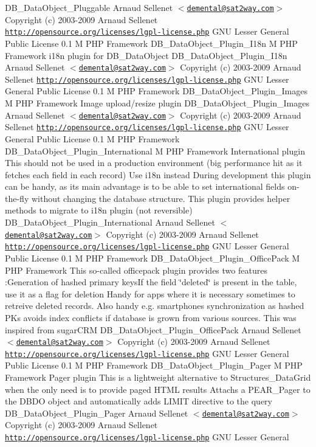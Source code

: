 \begin{Desc}
DB\_\-DataObject\_\-Pluggable  Arnaud Sellenet $<$\href{mailto:demental@sat2way.com}{\tt demental@sat2way.com}$>$  Copyright (c) 2003-2009 Arnaud Sellenet  \href{http://opensource.org/licenses/lgpl-license.php}{\tt http://opensource.org/licenses/lgpl-license.php} GNU Lesser General Public License  0.1  M PHP Framework   DB\_\-DataObject\_\-Plugin\_\-I18n  M PHP Framework  i18n plugin for DB\_\-DataObject   DB\_\-DataObject\_\-Plugin\_\-I18n  Arnaud Sellenet $<$\href{mailto:demental@sat2way.com}{\tt demental@sat2way.com}$>$  Copyright (c) 2003-2009 Arnaud Sellenet  \href{http://opensource.org/licenses/lgpl-license.php}{\tt http://opensource.org/licenses/lgpl-license.php} GNU Lesser General Public License  0.1  M PHP Framework   DB\_\-DataObject\_\-Plugin\_\-Images  M PHP Framework  Image upload/resize plugin   DB\_\-DataObject\_\-Plugin\_\-Images  Arnaud Sellenet $<$\href{mailto:demental@sat2way.com}{\tt demental@sat2way.com}$>$  Copyright (c) 2003-2009 Arnaud Sellenet  \href{http://opensource.org/licenses/lgpl-license.php}{\tt http://opensource.org/licenses/lgpl-license.php} GNU Lesser General Public License  0.1  M PHP Framework   DB\_\-DataObject\_\-Plugin\_\-International  M PHP Framework  International plugin This should not be used in a production environment (big performance hit as it fetches each field in each record) Use i18n instead During development this plugin can be handy, as its main advantage is to be able to set international fields on-the-fly without changing the database structure. This plugin provides helper methods to migrate to i18n plugin (not reversible)   DB\_\-DataObject\_\-Plugin\_\-International  Arnaud Sellenet $<$\href{mailto:demental@sat2way.com}{\tt demental@sat2way.com}$>$  Copyright (c) 2003-2009 Arnaud Sellenet  \href{http://opensource.org/licenses/lgpl-license.php}{\tt http://opensource.org/licenses/lgpl-license.php} GNU Lesser General Public License  0.1  M PHP Framework   DB\_\-DataObject\_\-Plugin\_\-OfficePack  M PHP Framework  This so-called officepack plugin provides two features :Generation of hashed primary keysIf the field \char`\"{}deleted\char`\"{} is present in the table, use it as a flag for deletion Handy for apps where it is necessary sometimes to retreive deleted records. Also handy e.g. smartphones synchronization as hashed PKs avoids index conflicts if database is grown from various sources. This was inspired from sugarCRM   DB\_\-DataObject\_\-Plugin\_\-OfficePack  Arnaud Sellenet $<$\href{mailto:demental@sat2way.com}{\tt demental@sat2way.com}$>$  Copyright (c) 2003-2009 Arnaud Sellenet  \href{http://opensource.org/licenses/lgpl-license.php}{\tt http://opensource.org/licenses/lgpl-license.php} GNU Lesser General Public License  0.1  M PHP Framework   DB\_\-DataObject\_\-Plugin\_\-Pager  M PHP Framework  Pager plugin This is a lightweight alternative to Structures\_\-DataGrid when the only need is to provide paged HTML results Attachs a PEAR\_\-Pager to the DBDO object and automatically adds LIMIT directive to the query   DB\_\-DataObject\_\-Plugin\_\-Pager  Arnaud Sellenet $<$\href{mailto:demental@sat2way.com}{\tt demental@sat2way.com}$>$  Copyright (c) 2003-2009 Arnaud Sellenet  \href{http://opensource.org/licenses/lgpl-license.php}{\tt http://opensource.org/licenses/lgpl-license.php} GNU Lesser General 
\end{Desc}
